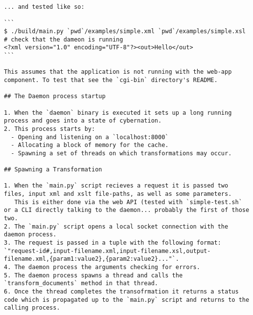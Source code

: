 \begin{lstlisting}[caption={Documentation about the application daemon code.}]
... and tested like so:

```
$ ./build/main.py `pwd`/examples/simple.xml `pwd`/examples/simple.xsl # check that the dameon is running
<?xml version="1.0" encoding="UTF-8"?><out>Hello</out>
```

This assumes that the application is not running with the web-app component. To test that see the `cgi-bin` directory's README.

## The Daemon process startup

1. When the `daemon` binary is executed it sets up a long running process and goes into a state of cybernation.
2. This process starts by:
  - Opening and listening on a `localhost:8000`
  - Allocating a block of memory for the cache.
  - Spawning a set of threads on which transformations may occur.

## Spawning a Transformation

1. When the `main.py` script recieves a request it is passed two files, input xml and xslt file-paths, as well as some parameters.
   This is either done via the web API (tested with `simple-test.sh` or a CLI directly talking to the daemon... probably the first of those two.
2. The `main.py` script opens a local socket connection with the daemon process.
3. The request is passed in a tuple with the following format: `"request-id#,input-filename.xml,input-filename.xsl,output-filename.xml,{param1:value2},{param2:value2}..."`.
4. The daemon process the arguments checking for errors.
5. The daemon process spawns a thread and calls the `transform_documents` method in that thread.
6. Once the thread completes the transofrmation it returns a status code which is propagated up to the `main.py` script and returns to the calling process.
\end{lstlisting}
